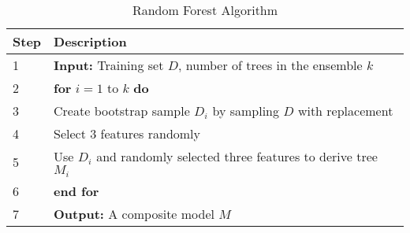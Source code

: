 \begin{table*}[h]
    \centering
    \caption{Random Forest Algorithm}
    \label{tab:table6}
    \begin{tabular}{@{}ll@{}}
    \hline
    \textbf{Step} & \textbf{Description} \\ 
    \hline
    1 & \textbf{Input:} Training set $D$, number of trees in the ensemble $k$ \\
    2 & \quad \textbf{for} $i = 1$ to $k$ \textbf{do} \\
    3 & \quad \quad Create bootstrap sample $D_i$ by sampling $D$ with replacement \\
    4 & \quad \quad Select 3 features randomly \\
    5 & \quad \quad Use $D_i$ and randomly selected three features to derive tree $M_i$ \\
    6 & \quad \textbf{end for} \\
    7 & \textbf{Output:} A composite model $M$ \\
    \hline
    \end{tabular}
\end{table*}